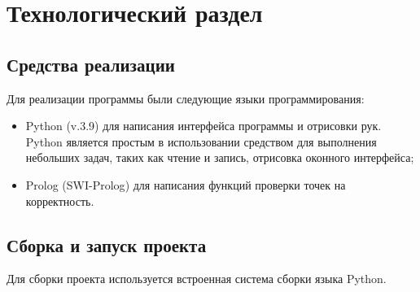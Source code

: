 \chapter{Технологический раздел}


\section{Средства реализации}
\hspace{0.6cm}Для реализации программы были следующие языки программирования:
\begin{itemize}
	\item Python (v.3.9\cite{web:python}) для написания интерфейса программы и отрисовки рук. Python является простым в использовании средством для выполнения небольших задач, таких как чтение и запись, отрисовка оконного интерфейса;
	\item Prolog (SWI-Prolog\cite{web:prolog}) для написания функций проверки точек на корректность.
\end{itemize}

\section{Сборка и запуск проекта}
\hspace{0.6cm}Для сборки проекта используется встроенная система сборки языка Python.
 


